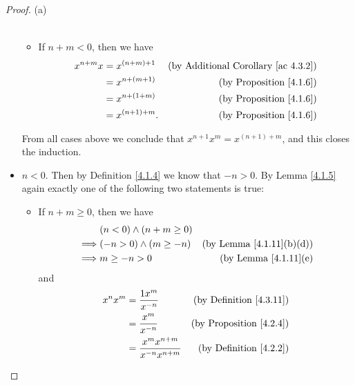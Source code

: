 \begin{proof}{(a)}
\begin{itemize}
\begin{itemize}
\begin{align*}
                        \end{align*}
                  \item If \(n + m < 0\), then we have
                        \begin{align*}
                            x^{n + m} x & = x^{(n + m) + 1}  & \text{(by Additional Corollary \ref{ac 4.3.2})} \\
                                        & = x^{n + (m + 1)}  & \text{(by Proposition \ref{4.1.6})}             \\
                                        & = x^{n + (1 + m)}  & \text{(by Proposition \ref{4.1.6})}             \\
                                        & = x^{(n + 1) + m}. & \text{(by Proposition \ref{4.1.6})}
                        \end{align*}
              \end{itemize}
              From all cases above we conclude that \(x^{n + 1} x^m = x^{(n + 1) + m}\), and this closes the induction.
        \item \(n < 0\).
              Then by Definition \ref{4.1.4} we know that \(-n > 0\).
              By Lemma \ref{4.1.5} again exactly one of the following two statements is true:
              \begin{itemize}
                  \item If \(n + m \geq 0\), then we have
                        \begin{align*}
                                     & (n < 0) \land (n + m \geq 0)                                        \\
                            \implies & (-n > 0) \land (m \geq -n)   & \text{(by Lemma \ref{4.1.11}(b)(d))} \\
                            \implies & m \geq -n > 0                & \text{(by Lemma \ref{4.1.11}(e)}
                        \end{align*}
                        and
                        \begin{align*}
                            x^n x^m & = \frac{1x^m}{x^{-n}}                    & \text{(by Definition \ref{4.3.11})}     \\
                                    & = \frac{x^m}{x^{-n}}                     & \text{(by Proposition \ref{4.2.4})}     \\
                                    & = \frac{x^m x^{n + m}}{x^{-n} x^{n + m}} & \text{(by Definition \ref{4.2.2})}      \\

\end{align*}
\end{itemize}
\end{itemize}
\end{proof}
